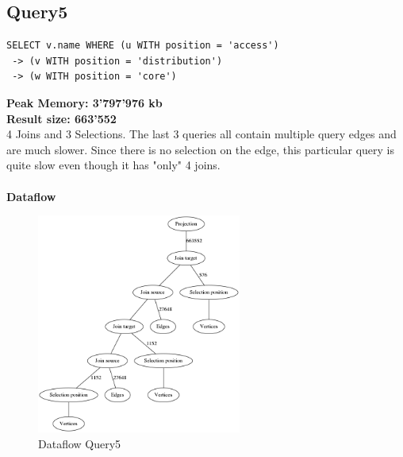 \documentclass[11pt,singlecolumn]{scrartcl}
\begin{document}
\subsection{Query5}
\begin{verbatim}
SELECT v.name WHERE (u WITH position = 'access')
 -> (v WITH position = 'distribution')
 -> (w WITH position = 'core')\end{verbatim}
\textbf{Peak Memory: 3'797'976 kb}\\
\textbf{Result size: 663'552}\\
4 Joins and 3 Selections. The last 3 queries all contain multiple query edges and are much slower. Since there is no selection on the edge, this particular query is quite slow even though it has "only" 4 joins.\\\\
\textbf{Dataflow}
\begin{figure}[H]
\includegraphics[width=0.6\textwidth]{graph5}
\caption{Dataflow Query5}
\end{figure}
\clearpage
\end{document}
